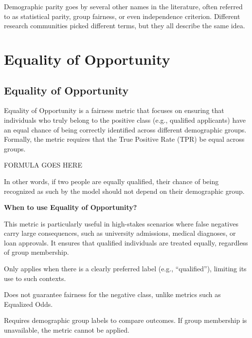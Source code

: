 \clearpage

\thispagestyle{customstyle}

{Demographic parity goes by several other names in the literature, often referred to as statistical parity, group fairness, or even
independence criterion. Different research communities picked different terms, but they all describe the same idea.}


\clearpage
\thispagestyle{biasfairnesstyle}
\section{Equality of Opportunity}
\subsection{Equality of Opportunity}

Equality of Opportunity is a fairness metric that focuses on ensuring that individuals who truly belong to the positive class
(e.g., qualified applicants) have an equal chance of being correctly identified across different demographic groups.
Formally, the metric requires that the True Positive Rate (TPR) be equal across groups.

\begin{center}
    FORMULA GOES HERE
\end{center}

In other words, if two people are equally qualified, their chance of being recognized as such by the model should not depend on their
demographic group.

\textbf{When to use Equality of Opportunity?}

This metric is particularly useful in high-stakes scenarios where false negatives carry large consequences, such as university admissions,
medical diagnoses, or loan approvals. It ensures that qualified individuals are treated equally, regardless of group membership.

{
\item Only applies when there is a clearly preferred label (e.g., “qualified”), limiting its use to such contexts.
\item Does not guarantee fairness for the negative class, unlike metrics such as Equalized Odds.
\item Requires demographic group labels to compare outcomes. If group membership is unavailable, the metric cannot be applied.
}

